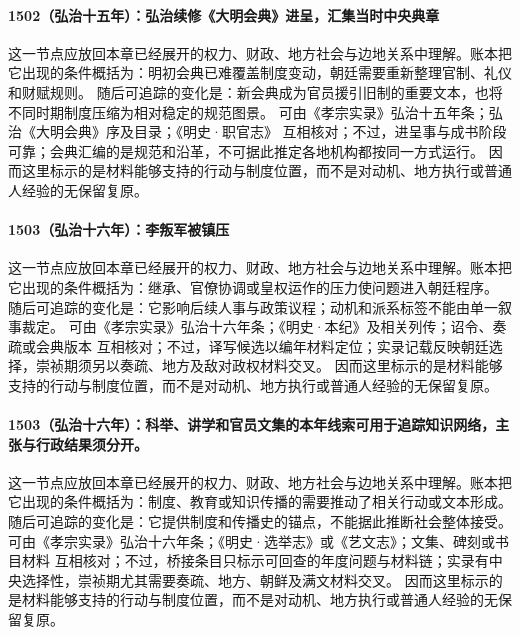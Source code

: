 \paragraph{1502（弘治十五年）：弘治续修《大明会典》进呈，汇集当时中央典章} 这一节点应放回本章已经展开的权力、财政、地方社会与边地关系中理解。账本把它出现的条件概括为：明初会典已难覆盖制度变动，朝廷需要重新整理官制、礼仪和财赋规则。 随后可追踪的变化是：新会典成为官员援引旧制的重要文本，也将不同时期制度压缩为相对稳定的规范图景。 可由《孝宗实录》弘治十五年条；弘治《大明会典》序及目录；《明史·职官志》 互相核对；不过，进呈事与成书阶段可靠；会典汇编的是规范和沿革，不可据此推定各地机构都按同一方式运行。 因而这里标示的是材料能够支持的行动与制度位置，而不是对动机、地方执行或普通人经验的无保留复原。

\paragraph{1503（弘治十六年）：李叛军被镇压} 这一节点应放回本章已经展开的权力、财政、地方社会与边地关系中理解。账本把它出现的条件概括为：继承、官僚协调或皇权运作的压力使问题进入朝廷程序。 随后可追踪的变化是：它影响后续人事与政策议程；动机和派系标签不能由单一叙事裁定。 可由《孝宗实录》弘治十六年条；《明史·本纪》及相关列传；诏令、奏疏或会典版本 互相核对；不过，译写候选以编年材料定位；实录记载反映朝廷选择，崇祯期须另以奏疏、地方及敌对政权材料交叉。 因而这里标示的是材料能够支持的行动与制度位置，而不是对动机、地方执行或普通人经验的无保留复原。

\paragraph{1503（弘治十六年）：科举、讲学和官员文集的本年线索可用于追踪知识网络，主张与行政结果须分开。} 这一节点应放回本章已经展开的权力、财政、地方社会与边地关系中理解。账本把它出现的条件概括为：制度、教育或知识传播的需要推动了相关行动或文本形成。 随后可追踪的变化是：它提供制度和传播史的锚点，不能据此推断社会整体接受。 可由《孝宗实录》弘治十六年条；《明史·选举志》或《艺文志》；文集、碑刻或书目材料 互相核对；不过，桥接条目只标示可回查的年度问题与材料链；实录有中央选择性，崇祯期尤其需要奏疏、地方、朝鲜及满文材料交叉。 因而这里标示的是材料能够支持的行动与制度位置，而不是对动机、地方执行或普通人经验的无保留复原。


